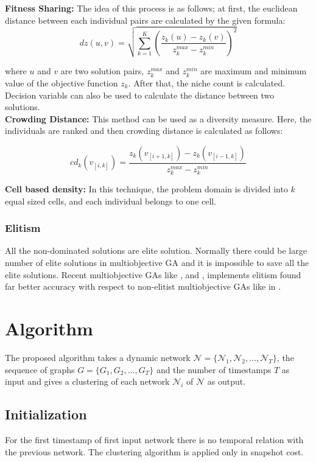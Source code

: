 \documentclass[12pt]{arsubmit}
\begin{document}
{\bf Fitness Sharing:} The idea of this process is as follows; at first, the euclidean distance between each individual pairs are calculated by the given formula: 
\begin{equation}
\label{fitshare}
dz(u,v) = \sqrt {\sum\limits_{k=1}^K {\left(\frac {z_k(u) - z_k(v)} {z_k^{max} - z_k^{min}}\right)}^2}
\end{equation}

where $u$ and $v$ are two solution pairs, $z_k^{max}$ and $z_k^{min}$  are maximum and minimum value of the objective function $z_k$. After that, the niche count is calculated. Decision variabls can also be used to calculate the distance between two solutions.\\
{\bf Crowding Distance:} This method can be used as a diversity measure. Here, the individuals are ranked and then crowding distance is calculated as follows: 

\begin{equation}
\label{crowding}
cd_k(v_{[i,k]}) = \frac {z_k(v_{[i+1,k]}) - z_k(v_{[i-1,k]})} {z_k^{max} - z_k^{min}}
\end{equation}

{\bf Cell based density:} In this technique, the problem domain is divided into $k$ equal sized cells, and each individual belongs to one cell. 

\subsubsection{Elitism}
All the non-dominated solutions are elite solution. Normally there could be large number of elite solutions in multiobjective GA and it is impossible to save all the elite solutions. Recent multiobjective GAs like \cite{spea}, \cite{deb} and \cite {stateart}, implements elitism found far better accuracy with respect to non-elitist multiobjective GAs like in \cite {reduce}. 


\section{Algorithm}
The proposed algorithm takes a dynamic network $\mathcal{N} = \{\mathcal{N}_1, \mathcal{N}_2,\ldots,\mathcal{N}_T\}$, the sequence of graphs $G = \{G_1,G_2,\ldots,G_T\}$ and the number of timestamps $T$ as input and gives a clustering of each network $\mathcal{N}_i$ of $\mathcal{N}$ as output.
\subsection {Initialization}
For the first timestamp of first input network there is no temporal relation with the previous network. The clustering algorithm is applied only in snapshot cost.
\end{document}
